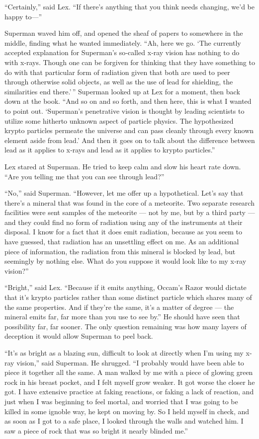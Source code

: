 ``Certainly,'' said Lex. ``If there's anything that you think needs
changing, we'd be happy to---''

Superman waved him off, and opened the sheaf of papers to somewhere in
the middle, finding what he wanted immediately. ``Ah, here we go. `The
currently accepted explanation for Superman's so‐called x‐ray vision has
nothing to do with x‐rays. Though one can be forgiven for thinking that
they have something to do with that particular form of radiation given
that both are used to peer through otherwise solid objects, as well as
the use of lead for shielding, the similarities end there.'\,'' Superman
looked up at Lex for a moment, then back down at the book. ``And so on
and so forth, and then here, this is what I wanted to point out.
`Superman's penetrative vision is thought by leading scientists to
utilize some hitherto unknown aspect of particle physics. The
hypothesized krypto particles permeate the universe and can pass cleanly
through every known element aside from lead.' And then it goes on to
talk about the difference between lead as it applies to x‐rays and lead
as it applies to krypto particles.''

Lex stared at Superman. He tried to keep calm and slow his heart rate
down. ``Are you telling me that you can see through lead?''

``No,'' said Superman. ``However, let me offer up a hypothetical. Let's
say that there's a mineral that was found in the core of a meteorite.
Two separate research facilities were sent samples of the meteorite ---
not by me, but by a third party --- and they could find no form of
radiation using any of the instruments at their disposal. I know for a
fact that it does emit radiation, because as you seem to have guessed,
that radiation has an unsettling effect on me. As an additional piece of
information, the radiation from this mineral is blocked by lead, but
seemingly by nothing else. What do you suppose it would look like to my
x‐ray vision?''

``Bright,'' said Lex. ``Because if it emits anything, Occam's Razor
would dictate that it's krypto particles rather than some distinct
particle which shares many of the same properties. And if they're the
same, it's a matter of degree --- the mineral emits far, far more than
you use to see by.'' He should have seen that possibility far, far
sooner. The only question remaining was how many layers of deception it
would allow Superman to peel back.

``It's as bright as a blazing sun, difficult to look at directly when
I'm using my x‐ray vision,'' said Superman. He shrugged. ``I probably
would have been able to piece it together all the same. A man walked by
me with a piece of glowing green rock in his breast pocket, and I felt
myself grow weaker. It got worse the closer he got. I have extensive
practice at faking reactions, or faking a lack of reaction, and just
when I was beginning to feel mortal, and worried that I was going to be
killed in some ignoble way, he kept on moving by. So I held myself in
check, and as soon as I got to a safe place, I looked through the walls
and watched him. I saw a piece of rock that was so bright it nearly
blinded me.''

